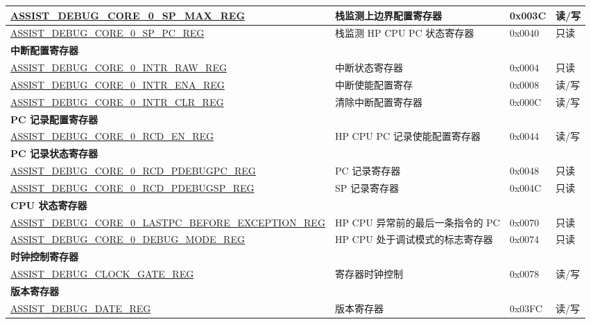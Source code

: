 \begin{longtable}{ | l| m{3.2cm} | l | l | }
\hyperref[regdesc:ASSISTDEBUGCORE0SPMAXREG]{ASSIST\_DEBUG\_CORE\_0\_SP\_MAX\_REG} & 栈监测上边界配置寄存器 & 0x003C &读/写 \\ \hline
\hyperref[regdesc:ASSISTDEBUGCORE0SPPCREG]{ASSIST\_DEBUG\_CORE\_0\_SP\_PC\_REG} & 栈监测 HP CPU PC 状态寄存器 & 0x0040 & 只读 \\ \hline
\multicolumn{4}{|l|}{\textbf{中断配置寄存器}} \\ \hline
\hyperref[regdesc:ASSISTDEBUGCORE0INTRRAWREG]{ASSIST\_DEBUG\_CORE\_0\_INTR\_RAW\_REG} & 中断状态寄存器 & 0x0004 & 只读 \\ \hline
\hyperref[regdesc:ASSISTDEBUGCORE0INTRENAREG]{ASSIST\_DEBUG\_CORE\_0\_INTR\_ENA\_REG} & 中断使能配置寄存 & 0x0008 & 读/写 \\ \hline
\hyperref[regdesc:ASSISTDEBUGCORE0INTRCLRREG]{ASSIST\_DEBUG\_CORE\_0\_INTR\_CLR\_REG} & 清除中断配置寄存器 & 0x000C & 读/写 \\ \hline
\multicolumn{4}{|l|}{\textbf{PC 记录配置寄存器}} \\ \hline
\hyperref[regdesc:ASSISTDEBUGCORE0RCDENREG]{ASSIST\_DEBUG\_CORE\_0\_RCD\_EN\_REG} & HP CPU PC 记录使能配置寄存器 & 0x0044 &读/写 \\ \hline
\multicolumn{4}{|l|}{\textbf{PC 记录状态寄存器}} \\ \hline
\hyperref[regdesc:ASSISTDEBUGCORE0RCDPDEBUGPCREG]{ASSIST\_DEBUG\_CORE\_0\_RCD\_PDEBUGPC\_REG} & PC 记录寄存器 & 0x0048 & 只读 \\ \hline
\hyperref[regdesc:ASSISTDEBUGCORE0RCDPDEBUGSPREG]{ASSIST\_DEBUG\_CORE\_0\_RCD\_PDEBUGSP\_REG} & SP 记录寄存器 & 0x004C & 只读 \\ \hline
\multicolumn{4}{|l|}{\textbf{CPU 状态寄存器}} \\ \hline
\hyperref[regdesc:ASSISTDEBUGCORE0LASTPCBEFOREEXCEPTIONREG]{ASSIST\_DEBUG\_CORE\_0\_LASTPC\_BEFORE\_EXCEPTION\_REG} & HP CPU 异常前的最后一条指令的 PC  & 0x0070 & 只读 \\ \hline
\hyperref[regdesc:ASSISTDEBUGCORE0DEBUGMODEREG]{ASSIST\_DEBUG\_CORE\_0\_DEBUG\_MODE\_REG} & HP CPU 处于调试模式的标志寄存器 & 0x0074 & 只读 \\ \hline
\multicolumn{4}{|l|}{\textbf{时钟控制寄存器}} \\ \hline
\hyperref[regdesc:ASSISTDEBUGCLOCKGATEREG]{ASSIST\_DEBUG\_CLOCK\_GATE\_REG} & 寄存器时钟控制 & 0x0078 & 读/写 \\ \hline
\multicolumn{4}{|l|}{\textbf{版本寄存器}} \\ \hline
\hyperref[regdesc:ASSISTDEBUGDATEREG]{ASSIST\_DEBUG\_DATE\_REG} & 版本寄存器 & 0x03FC & 读/写 \\ \hline
\end{longtable}
